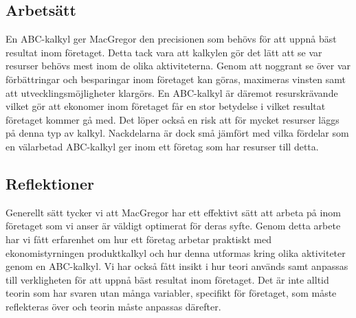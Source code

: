 \subsection{Arbetsätt}
En ABC-kalkyl ger MacGregor den precisionen som behövs för att uppnå bäst resultat inom företaget. Detta tack vara att kalkylen gör det lätt att se var resurser behövs mest inom de olika aktiviteterna. Genom att noggrant se över var förbättringar och besparingar inom företaget kan göras, maximeras vinsten samt att utvecklingsmöjligheter klargörs. En ABC-kalkyl är däremot resurskrävande vilket gör att ekonomer inom företaget får en stor betydelse i vilket resultat företaget kommer gå med. Det löper också en risk att för mycket resurser läggs på denna typ av kalkyl. Nackdelarna är dock små jämfört med vilka fördelar som en välarbetad ABC-kalkyl ger inom ett företag som har resurser till detta. 





\subsection{Reflektioner}
Generellt sätt tycker vi att MacGregor har ett effektivt sätt att arbeta på inom företaget som vi anser är väldigt optimerat för deras syfte. Genom detta arbete har vi fått erfarenhet om hur ett företag arbetar praktiskt med ekonomistyrningen produktkalkyl och hur denna utformas kring olika aktiviteter genom en ABC-kalkyl. Vi har också fått insikt i hur teori används samt anpassas till verkligheten för att uppnå bäst resultat inom företaget. Det är inte alltid teorin som har svaren utan många variabler, specifikt för företaget, som måste reflekteras över och teorin måste anpassas därefter.

